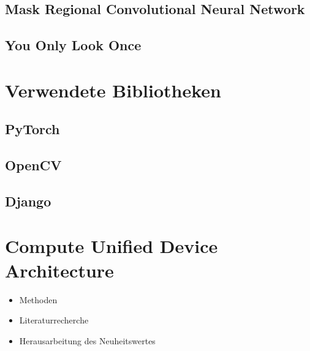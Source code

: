 \subsection{Mask Regional Convolutional Neural Network}

\subsection{You Only Look Once}


\section{Verwendete Bibliotheken}

\subsection{PyTorch}

\subsection{OpenCV}

\subsection{Django}


\section{Compute Unified Device Architecture}


\begin{itemize}
	\item Methoden
	\item Literaturrecherche
	\item Herausarbeitung des Neuheitswertes 
\end{itemize}
